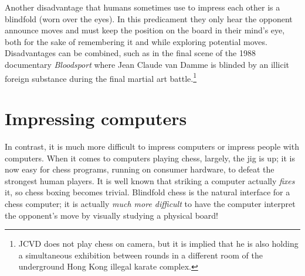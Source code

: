 \documentclass[twocolumn]{amsart}
\begin{document}
Another disadvantage that humans sometimes use to impress each other
is a blindfold (worn over the eyes). In this predicament they only
hear the opponent announce moves and must keep the position on the
board in their mind's eye, both for the sake of remembering it and
while exploring potential moves.
Disadvantages can be combined, such as in the final scene of the 1988
documentary {\it Bloodsport} where Jean Claude van Damme is blinded by
an illicit foreign substance during the final martial art
battle.\footnote{JCVD does not play chess on camera, but it is implied
  that he is also holding a simultaneous exhibition between rounds in
  a different room of the underground Hong Kong illegal karate
  complex.}

\section{Impressing computers}

In contrast, it is much more difficult to impress computers or impress
people with computers. When it comes to computers playing chess,
largely, the jig is up; it is now easy for chess programs, running on
consumer hardware, to defeat the strongest human players. It is well
known that striking a computer actually {\em fixes} it, so chess
boxing becomes trivial. Blindfold chess is the natural interface for a
chess computer; it is actually {\em much more difficult} to have the
computer interpret the opponent's move by visually studying a physical
board!

\end{document}
